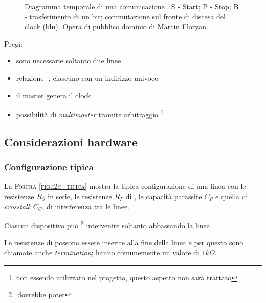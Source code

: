 \begin{figure}[t]
	\centering
{}
    \caption{Diagramma temporale di una comunicazione \iic{}. S - Start; P - Stop; B - trasferimento di un bit; commutazione sul fronte di discesa del clock (blu). Opera di pubblico dominio di Marcin Floryan.}
    \label{fig:i2c_trans}
\end{figure}


    Pregi:
\begin{itemize}
	\item {sono necessarie soltanto due linee}
	\item {relazione {\master}-{\slave}, ciascuno con un indirizzo univoco}
	\item {il master genera il clock}
	\item {
    	possibilità di \textit{multimaster} tramite arbitraggio
   		\footnote {
        	non essendo utilizzato nel progetto,
        	questo aspetto non sarà trattato
        }
	}
\end{itemize}

\subsection{Considerazioni hardware}

\subsubsection{Configurazione tipica}
La \textsc{Figura \ref{fig:i2c_tipica}}
mostra la tipica configurazione di una linea {\iic}
con le resistenze $R_S$ in serie,
le resistenze $R_P$ di \pullup,
le capacità parassite $C_P$
e quella di \textit{crosstalk} $C_C$, di interferenza tra le linee.

Ciascun dispositivo può \footnote{\,dovrebbe poter}
intervenire soltanto abbassando la linea.

Le resistenze di {\pullup} possono essere inserite alla fine della linea
e per questo sono chiamate anche \textit{{\iic} termination};
hanno comunemente un valore di $1k\Omega$.

